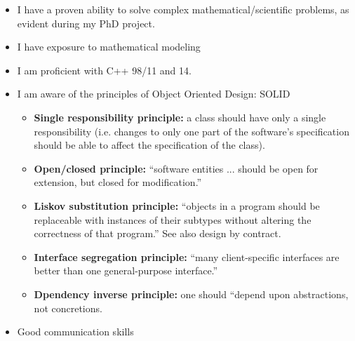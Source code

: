 \documentclass[12pt,a4paper]{article}
\begin{document}
\begin{itemize}%
\item I have a proven ability to solve complex mathematical/scientific 
  problems, as evident during my PhD project.
\item I have exposure to mathematical modeling
\item I am proficient with C++ 98/11 and 14.
\item I am aware of the principles of Object Oriented Design: SOLID
  \begin{itemize}%
  \item \textbf{Single responsibility principle:} a class should have only a
    single responsibility (i.e. changes to only one part of the software's
    specification should be able to affect the specification of the class).
  \item \textbf{Open/closed principle:} ``software entities ... should be
    open for extension, but closed for modification.''
  \item \textbf{Liskov substitution principle:} ``objects in a program
    should be replaceable with instances of their subtypes without altering
    the correctness of that program.'' See also design by contract.
  \item \textbf{Interface segregation principle:} ``many client-specific
    interfaces are better than one general-purpose interface.''
  \item \textbf{Dpendency inverse principle:} one should “depend upon
    abstractions, not concretions.
  \end{itemize}
\item Good communication skills
\end{itemize}





 
 
\end{document}

